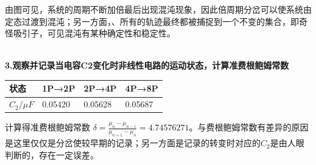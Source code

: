 \documentclass[UTF8]{ctexart}
\begin{document}
\begin{figure}[H]
\end{figure}
由图可见，系统的周期不断加倍最后出现混沌现象，因此倍周期分岔可以使系统由定态过渡到混沌；另一方面，、所有的轨迹最终都被捕捉到一个不变的集合，即奇怪吸引子，可见混沌有某种确定性和稳定性。

~\\
\noindent\textbf{3.观察并记录当电容C2变化时非线性电路的运动状态，计算准费根鲍姆常数}
\begin{table}[H]
\centering
\tiny
\begin{tabular}{|l|l|l|l|}
\hline
状态          & 1P→2P   & 2P→4P   & 4P→8P   \\ \hline
$C_2/\mu F$ & 0.05420 & 0.05628 & 0.05687 \\ \hline
\end{tabular}
\end{table}
计算得准费根鲍姆常数
$\delta =\frac{\mu_{n}-\mu_{n-1}}{\mu_{n+1}-\mu_{n}}=4.74576271$。与费根鲍姆常数有差异的原因是这里仅仅是分岔使较早期的记录；另一方面是记录的转变时对应的$C_2$是由人眼判断的，存在一定误差。
\end{document}
